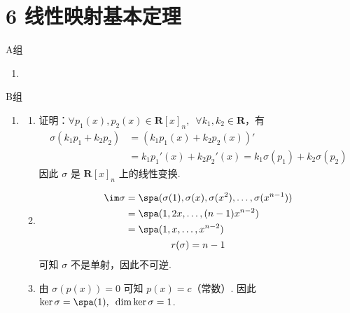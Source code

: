 \section*{6 线性映射基本定理}

\vspace{2ex}

\centerline{\heiti A组}
\begin{enumerate}
    \item
\end{enumerate}

\centerline{\heiti B组}
\begin{enumerate}
    \item \begin{enumerate}
              \item 证明：$ \forall p_1(x), p_2(x) \in \mathbf{R}[x]_n,\enspace \forall k_1, k_2 \in \mathbf{R} $，有
                    \begin{align*}
                        \sigma(k_1 p_1 + k_2 p_2) & = (k_1 p_1(x) + k_2 p_2(x))'                                    \\
                                                  & = k_1 p_1'(x) + k_2 p_2'(x) = k_1 \sigma(p_1) + k_2 \sigma(p_2)
                    \end{align*}
                    因此 $ \sigma $ 是 $ \mathbf{R}[x]_n $ 上的线性变换.

              \item \begin{gather*}
                        \begin{aligned}
                            \im \sigma & = \spa(\sigma(1), \sigma(x), \sigma(x^2), \ldots, \sigma(x^{n - 1})) \\
                                       & = \spa(1, 2x, \ldots, (n - 1) x^{n - 2})                             \\
                                       & = \spa(1, x, \ldots, x^{n - 2})
                        \end{aligned} \\
                        r(\sigma) = n - 1
                    \end{gather*}
                    可知 $ \sigma $ 不是单射，因此不可逆.

              \item 由 $ \sigma(p(x)) = 0 $ 可知 $ p(x) = c $（常数）. 因此 $ \ker \sigma = \spa(1),\enspace \dim \ker \sigma = 1 $.


\end{enumerate}
\end{enumerate}
